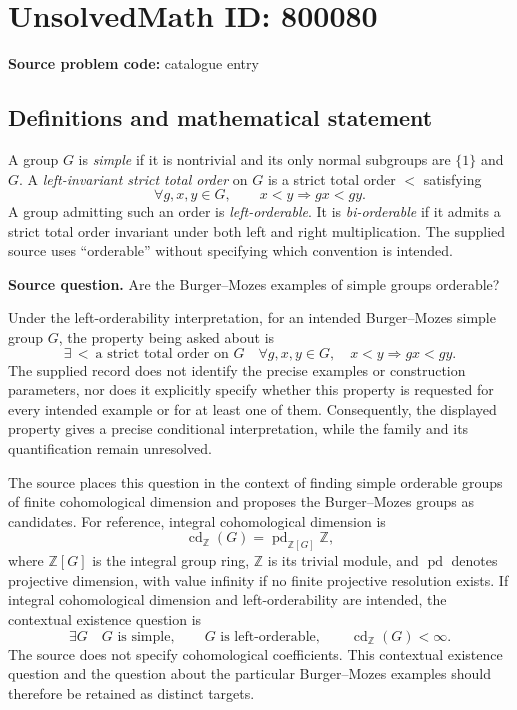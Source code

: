 \documentclass[11pt]{article}
\newcommand{\Z}{\mathbb{Z}}
\begin{document}
\section*{UnsolvedMath ID: 800080}
\textbf{Source problem code:} catalogue entry
\subsection{Definitions and mathematical statement}
A group \(G\) is \emph{simple} if it is nontrivial and its only normal subgroups are \(\{1\}\) and \(G\). A \emph{left-invariant strict total order} on \(G\) is a strict total order \(<\) satisfying
\[
\forall g,x,y\in G,\qquad x<y\Longrightarrow gx<gy.
\]
A group admitting such an order is \emph{left-orderable}. It is \emph{bi-orderable} if it admits a strict total order invariant under both left and right multiplication. The supplied source uses ``orderable'' without specifying which convention is intended.

\textbf{Source question.} Are the Burger--Mozes examples of simple groups orderable?

Under the left-orderability interpretation, for an intended Burger--Mozes simple group \(G\), the property being asked about is
\[
\exists\,<\ \text{a strict total order on }G\quad
\forall g,x,y\in G,\quad x<y\Longrightarrow gx<gy.
\]
The supplied record does not identify the precise examples or construction parameters, nor does it explicitly specify whether this property is requested for every intended example or for at least one of them. Consequently, the displayed property gives a precise conditional interpretation, while the family and its quantification remain unresolved.

The source places this question in the context of finding simple orderable groups of finite cohomological dimension and proposes the Burger--Mozes groups as candidates. For reference, integral cohomological dimension is
\[
\operatorname{cd}_{\Z}(G)
=\operatorname{pd}_{\Z[G]}\Z,
\]
where \(\Z[G]\) is the integral group ring, \(\Z\) is its trivial module, and \(\operatorname{pd}\) denotes projective dimension, with value infinity if no finite projective resolution exists. If integral cohomological dimension and left-orderability are intended, the contextual existence question is
\[
\exists G\quad
G\text{ is simple},\qquad
G\text{ is left-orderable},\qquad
\operatorname{cd}_{\Z}(G)<\infty.
\]
The source does not specify cohomological coefficients. This contextual existence question and the question about the particular Burger--Mozes examples should therefore be retained as distinct targets.
\end{document}
